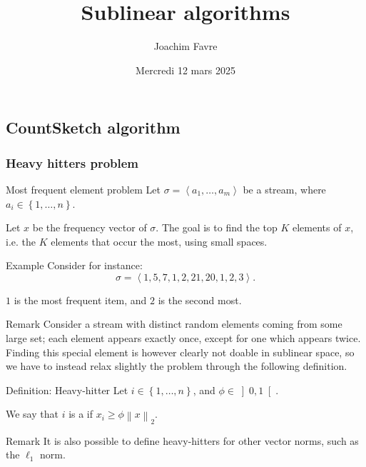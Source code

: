\documentclass[a4paper]{article}
\title{Sublinear algorithms}
\author{Joachim Favre}
\date{Mercredi 12 mars 2025}
\begin{document}
\maketitle


\subsection{CountSketch algorithm}
\subsubsection{Heavy hitters problem}

\begin{parag}{Most frequent element problem}
    Let $\sigma = \left\langle a_1, \ldots, a_m \right\rangle$ be a stream, where $a_i \in \left\{1, \ldots, n\right\}$. 

    Let $x$ be the frequency vector of $\sigma$. The goal is to find the top $K$ elements of $x$, i.e. the $K$ elements that occur the most, using small spaces.

    \begin{subparag}{Example}
        Consider for instance: 
        \[\sigma = \left\langle 1, 5, 7, 1, 2, 21, 20, 1, 2, 3 \right\rangle.\]

        $1$ is the most frequent item, and $2$ is the second most.
    \end{subparag}
    
    \begin{subparag}{Remark}
        Consider a stream with distinct random elements coming from some large set; each element appears exactly once, except for one which appears twice. Finding this special element is however clearly not doable in sublinear space, so we have to instead relax slightly the problem through the following definition.
    \end{subparag}
\end{parag}

\begin{parag}{Definition: Heavy-hitter}
    Let $i \in \left\{1, \ldots, n\right\}$, and $\phi \in \left]0, 1\right[ $.

    We say that $i$ is a  if $x_i \geq \phi \left\|x\right\|_2$.

    \begin{subparag}{Remark}
        It is also possible to define heavy-hitters for other vector norms, such as the $\ell_1$ norm.
    \end{subparag}
\end{parag}
\end{document}
